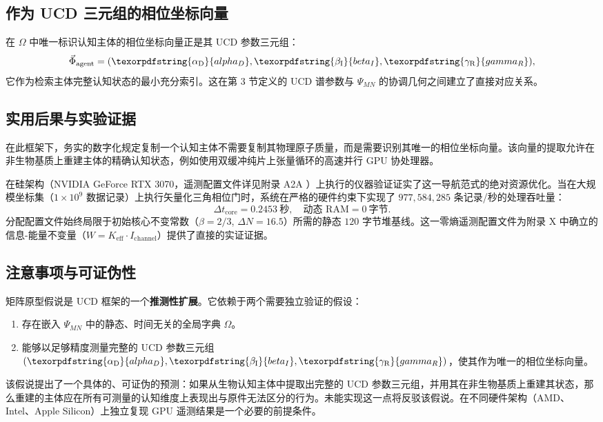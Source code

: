 \documentclass[11pt,a4paper]{article}
\DeclareRobustCommand{\alD}{\texorpdfstring{\ensuremath{\alpha_{\mathrm{D}}}}{alpha_D}}
\DeclareRobustCommand{\beI}{\texorpdfstring{\ensuremath{\beta_{\mathrm{I}}}}{beta_I}}
\DeclareRobustCommand{\gaR}{\texorpdfstring{\ensuremath{\gamma_{\mathrm{R}}}}{gamma_R}}
\begin{document}
	\subsection{作为 UCD 三元组的相位坐标向量}
	
	在 \(\Omega\) 中唯一标识认知主体的相位坐标向量正是其 UCD 参数三元组：
	\[
	\vec{\Phi}_{\mathrm{agent}} = (\alD, \beI, \gaR),
	\]
	它作为检索主体完整认知状态的最小充分索引。这在第 3 节定义的 UCD 谱参数与 \(\Psi_{MN}\) 的协调几何之间建立了直接对应关系。
	
	\subsection{实用后果与实验证据}
	
	在此框架下，务实的数字化规定复制一个认知主体不需要复制其物理原子质量，而是需要识别其唯一的相位坐标向量。该向量的提取允许在非生物基质上重建主体的精确认知状态，例如使用双缓冲纯片上张量循环的高速并行 GPU 协处理器。
	
	在硅架构（NVIDIA GeForce RTX 3070，遥测配置文件详见附录 A2A \cite{yuct_a2a}）上执行的仪器验证证实了这一导航范式的绝对资源优化。当在大规模坐标集（\(1\times10^9\) 数据记录）上执行矢量化三角相位门时，系统在严格的硬件约束下实现了 \(977,584,285\) 条记录/秒的处理吞吐量：
	\begin{equation}
		\Delta t_{\mathrm{core}} = 0.2453\ \text{秒}, \quad \text{动态 RAM} = 0\ \text{字节}.
	\end{equation}
	分配配置文件始终局限于初始核心不变常数（\(\beta = 2/3\), \(\Delta N = 16.5\)）所需的静态 \(120\) 字节堆基线。这一零熵遥测配置文件为附录 X \cite{yuct_appX} 中确立的信息-能量不变量（\(W = K_{\mathrm{eff}} \cdot I_{\mathrm{channel}}\)）提供了直接的实证证据。
	
	\subsection{注意事项与可证伪性}
	
	矩阵原型假说是 UCD 框架的一个\textbf{推测性扩展}。它依赖于两个需要独立验证的假设：
	\begin{enumerate}
		\item 存在嵌入 \(\Psi_{MN}\) 中的静态、时间无关的全局字典 \(\Omega\)。
		\item 能够以足够精度测量完整的 UCD 参数三元组 \((\alD, \beI, \gaR)\)，使其作为唯一的相位坐标向量。
	\end{enumerate}
	该假说提出了一个具体的、可证伪的预测：如果从生物认知主体中提取出完整的 UCD 参数三元组，并用其在非生物基质上重建其状态，那么重建的主体应在所有可测量的认知维度上表现出与原件无法区分的行为。未能实现这一点将反驳该假说。在不同硬件架构（AMD、Intel、Apple Silicon）上独立复现 GPU 遥测结果是一个必要的前提条件。
	
\end{document}
